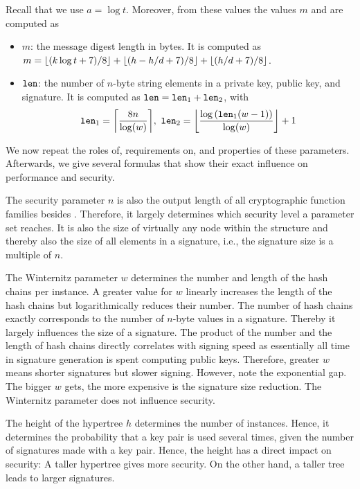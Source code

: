 Recall that
we use $a = \log t$. Moreover, from these values the values $m$ and \len are
computed as
\begin{itemize}
  \item $m$: the message digest length in bytes.
  It is computed as $m = \lfloor(k\log t +7)/ 8\rfloor + \lfloor(h - h/d +7)/ 8\rfloor + \lfloor(h / d +7)/ 8\rfloor$.
  \item $\texttt{len}$: the number of $n$-byte string elements in a \wotsp private
        key, public key, and signature. It is computed as $\texttt{len} =
        \texttt{len}_1 + \texttt{len}_2$, with
        \begin{equation*}
          \len_1 = \ceil*{\frac{8n}{\log(w)}},\
          \len_2 = \floor*{\frac{\log{(\len_1(w - 1))}}{\log(w)}} + 1
        \end{equation*}
\end{itemize}

We now repeat the roles of, requirements on, and properties of these parameters.
Afterwards, we give several formulas that show their exact influence on
performance and security.

The security parameter $n$ is also the output length of all cryptographic function
families besides \sphincsHmsg. Therefore, it largely determines which security
level a parameter set reaches. It is also the size of virtually any node
within the \spx structure and thereby also the size of all elements in a
signature, i.e., the signature size is a multiple of $n$.

The Winternitz parameter $w$ determines the number and length of the hash chains per
\wotsp instance. A greater value for $w$ linearly increases the length of the
hash chains but logarithmically reduces their number. The number of hash
chains exactly corresponds to the number of $n$-byte values in a \wotsp
signature. Thereby it largely influences the size of a \spx signature.
The product of the number and the length of hash chains directly correlates with
signing speed as essentially all time in \hyper signature generation is spent
computing \wotsp public keys. Therefore, greater $w$ means shorter signatures
but slower signing. However, note the exponential gap. The bigger $w$ gets,
the more expensive is the signature size reduction. The Winternitz parameter
does not influence \spx security.

The height of the hypertree $h$ determines the number of \fors instances. Hence,
it determines the probability that a \fors key pair is used several times,
given the number of signatures made with a \spx key pair. Hence, the height has
a direct impact on security: A taller hypertree gives more security. On the
other hand, a taller tree leads to larger signatures.

